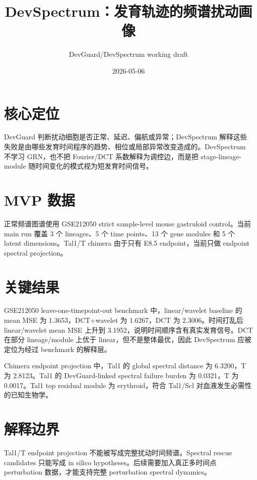 \documentclass[11pt]{article}
\title{DevSpectrum：发育轨迹的频谱扰动画像}
\author{DevGuard/DevSpectrum working draft}
\date{2026-05-06}
\begin{document}
\maketitle

\section*{核心定位}

DevGuard 判断扰动细胞是否正常、延迟、偏航或异常；DevSpectrum 解释这些失败是由哪些发育时间程序的趋势、相位或局部异常改变造成的。DevSpectrum 不学习 GRN，也不把 Fourier/DCT 系数解释为调控边，而是把 stage-lineage-module 随时间变化的模式视为短发育时间信号。

\section*{MVP 数据}

正常频谱图谱使用 GSE212050 strict sample-level mouse gastruloid control。当前 main run 覆盖 3 个 lineages、5 个 time points、13 个 gene modules 和 5 个 latent dimensions。Tal1/T chimera 由于只有 E8.5 endpoint，当前只做 endpoint spectral projection。

\section*{关键结果}

GSE212050 leave-one-timepoint-out benchmark 中，linear/wavelet baseline 的 mean MSE 为 1.3653，DCT+wavelet 为 1.6267，DCT 为 2.3006。时间打乱后 linear/wavelet mean MSE 上升到 3.1952，说明时间顺序含有真实发育信号。DCT 在部分 lineage/module 上优于 linear，但不是整体最优，因此 DevSpectrum 应被定位为经过 benchmark 的解释层。

Chimera endpoint projection 中，Tal1 的 global spectral distance 为 6.3200，T 为 2.8123。Tal1 的 DevGuard-linked spectral failure burden 为 0.0321，T 为 0.0017。Tal1 top residual module 为 erythroid，符合 Tal1/Scl 对血液发生必需性的已知生物学。

\section*{解释边界}

Tal1/T endpoint projection 不能被写成完整扰动时间频谱。Spectral rescue candidates 只能写成 in silico hypotheses。后续需要加入真正多时间点 perturbation 数据，才能支持完整 perturbation spectral dynamics。
\end{document}
